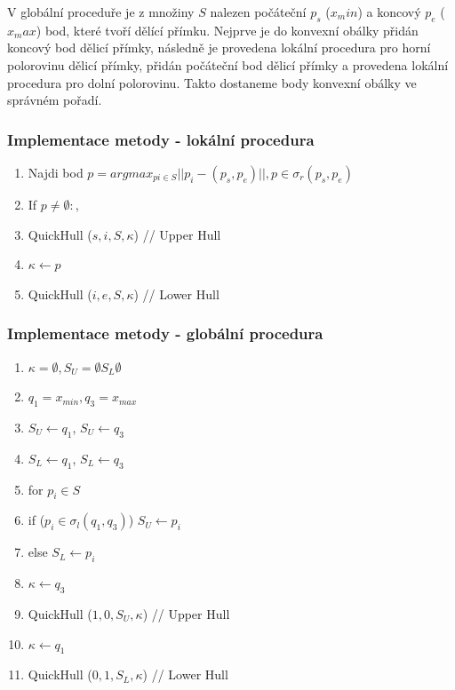 \documentclass[a4paper, 12pt]{article}
\begin{document}
V globální proceduře je z množiny $S$ nalezen počáteční $p_s$ ($x_min$) a koncový $p_e$ ($x_max$) bod, které tvoří dělící přímku. Nejprve je do konvexní obálky přidán koncový bod dělicí přímky, následně je provedena lokální procedura pro horní polorovinu dělicí přímky, přidán počáteční bod dělicí přímky a  provedena lokální procedura pro dolní polorovinu. Takto dostaneme body konvexní obálky ve správném pořadí.

\subsubsection{Implementace metody - lokální procedura}
\begin{enumerate}
	\item Najdi bod $p = arg max_{pi \in S} ||p_i - (p_s, p_e)||, p \in \sigma_r (p_s, p_e)$
	\item If $ p\neq\emptyset:$,
	\item \hspace {1cm} QuickHull ($s,i,S,\kappa$) // Upper Hull
	\item \hspace {1cm} $\kappa \longleftarrow p$
	\item \hspace {1cm} QuickHull ($i,e,S,\kappa$) // Lower Hull
\end{enumerate}

\subsubsection{Implementace metody - globální procedura}

\begin{enumerate}
	\item  $\kappa = \emptyset, S_U = \emptyset S_L \emptyset$
	\item $q_1 = x_{min}, q_3 = x_{max}$
	\item $S_U \longleftarrow q_1$, $S_U \longleftarrow q_3$
	\item $S_L \longleftarrow q_1$, $S_L \longleftarrow q_3$
	\item for $p_i \in S$
	\item \hspace {1cm} if ($p_i \in \sigma_l (q_1, q_3)$) $S_U \longleftarrow p_i$
	\item \hspace {1cm} else $S_L \longleftarrow p_i$
	\item $\kappa \longleftarrow q_3$
	\item QuickHull ($1,0,S_U,\kappa$) // Upper Hull
	\item $\kappa \longleftarrow q_1$
	\item QuickHull ($0,1,S_L,\kappa$) // Lower Hull
\end{enumerate}
\clearpage
\end{document}
